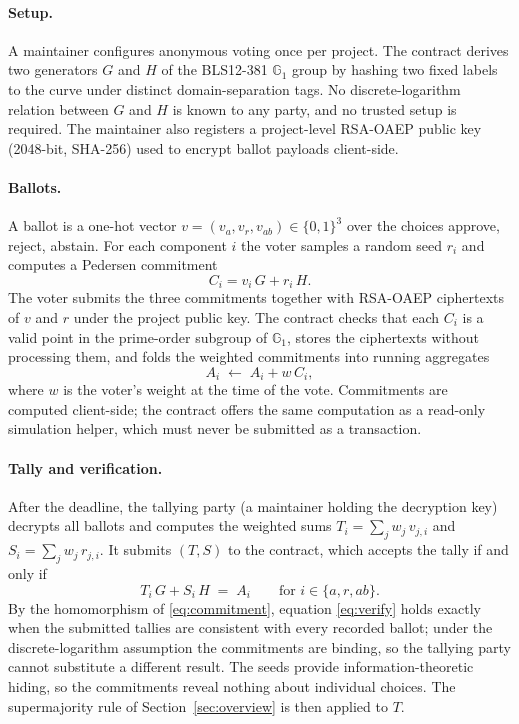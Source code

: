 \documentclass[11pt]{article}
\begin{document}
\paragraph{Setup.}
A maintainer configures anonymous voting once per project. The contract
derives two generators $G$ and $H$ of the BLS12-381 $\mathbb{G}_1$ group by
hashing two fixed labels to the curve under distinct domain-separation tags.
No discrete-logarithm relation between $G$ and $H$ is known to any party, and
no trusted setup is required. The maintainer also registers a project-level
RSA-OAEP public key (2048-bit, SHA-256) used to encrypt ballot payloads
client-side.

\paragraph{Ballots.}
A ballot is a one-hot vector $v = (v_a, v_r, v_{ab}) \in \{0,1\}^3$ over the
choices approve, reject, abstain. For each component $i$ the voter samples a
random seed $r_i$ and computes a Pedersen commitment~\citep{pedersen}
\begin{equation}
C_i = v_i\, G + r_i\, H .
\label{eq:commitment}
\end{equation}
The voter submits the three commitments together with RSA-OAEP ciphertexts of
$v$ and $r$ under the project public key. The contract checks that each $C_i$ is a
valid point in the prime-order subgroup of $\mathbb{G}_1$, stores the
ciphertexts without processing them, and folds the weighted commitments into
running aggregates
\begin{equation}
A_i \;\leftarrow\; A_i + w\, C_i ,
\label{eq:aggregate}
\end{equation}
where $w$ is the voter's weight at the time of the vote. Commitments are
computed client-side; the contract offers the same computation as a read-only
simulation helper, which must never be submitted as a transaction.

\paragraph{Tally and verification.}
After the deadline, the tallying party (a maintainer holding the decryption
key) decrypts all ballots and computes the weighted sums
$T_i = \sum_j w_j\, v_{j,i}$ and $S_i = \sum_j w_j\, r_{j,i}$. It submits
$(T, S)$ to the contract, which accepts the tally if and only if
\begin{equation}
T_i\, G + S_i\, H \;=\; A_i \qquad \text{for } i \in \{a, r, ab\}.
\label{eq:verify}
\end{equation}
By the homomorphism of \eqref{eq:commitment}, equation \eqref{eq:verify}
holds exactly when the submitted tallies are consistent with every recorded
ballot; under the discrete-logarithm assumption the commitments are binding,
so the tallying party cannot substitute a different result. The seeds provide
information-theoretic hiding, so the commitments reveal nothing about
individual choices. The supermajority rule of Section~\ref{sec:overview} is
then applied to $T$.
\end{document}
